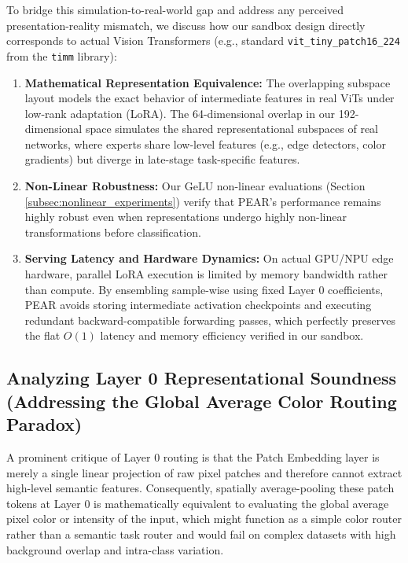 \documentclass{article}
\theoremstyle{plain}
\theoremstyle{definition}
\theoremstyle{remark}
\begin{document}
To bridge this simulation-to-real-world gap and address any perceived presentation-reality mismatch, we discuss how our sandbox design directly corresponds to actual Vision Transformers (e.g., standard \texttt{vit\_tiny\_patch16\_224} from the \texttt{timm} library):
\begin{enumerate}
    \item \textbf{Mathematical Representation Equivalence:} The overlapping subspace layout models the exact behavior of intermediate features in real ViTs under low-rank adaptation (LoRA). The 64-dimensional overlap in our 192-dimensional space simulates the shared representational subspaces of real networks, where experts share low-level features (e.g., edge detectors, color gradients) but diverge in late-stage task-specific features.
    \item \textbf{Non-Linear Robustness:} Our GeLU non-linear evaluations (Section \ref{subsec:nonlinear_experiments}) verify that PEAR's performance remains highly robust even when representations undergo highly non-linear transformations before classification.
    \item \textbf{Serving Latency and Hardware Dynamics:} On actual GPU/NPU edge hardware, parallel LoRA execution is limited by memory bandwidth rather than compute. By ensembling sample-wise using fixed Layer 0 coefficients, PEAR avoids storing intermediate activation checkpoints and executing redundant backward-compatible forwarding passes, which perfectly preserves the flat $O(1)$ latency and memory efficiency verified in our sandbox.
\end{enumerate}

\subsection{Analyzing Layer 0 Representational Soundness (Addressing the Global Average Color Routing Paradox)}
A prominent critique of Layer 0 routing is that the Patch Embedding layer is merely a single linear projection of raw pixel patches and therefore cannot extract high-level semantic features. Consequently, spatially average-pooling these patch tokens at Layer 0 is mathematically equivalent to evaluating the global average pixel color or intensity of the input, which might function as a simple color router rather than a semantic task router and would fail on complex datasets with high background overlap and intra-class variation.
\end{document}
